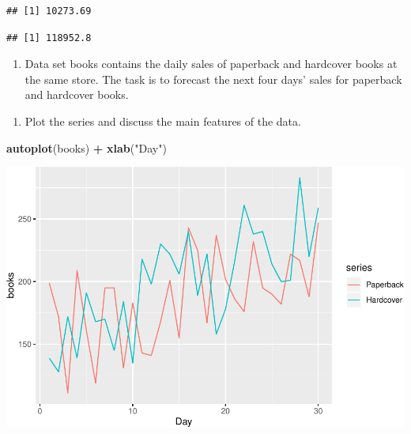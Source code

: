 \documentclass[]{article}
\newenvironment{Shaded}{\begin{snugshade}}{\end{snugshade}}
\newcommand{\KeywordTok}[1]{\textcolor[rgb]{0.13,0.29,0.53}{\textbf{#1}}}
\newcommand{\DataTypeTok}[1]{\textcolor[rgb]{0.13,0.29,0.53}{#1}}
\newcommand{\DecValTok}[1]{\textcolor[rgb]{0.00,0.00,0.81}{#1}}
\newcommand{\FloatTok}[1]{\textcolor[rgb]{0.00,0.00,0.81}{#1}}
\newcommand{\StringTok}[1]{\textcolor[rgb]{0.31,0.60,0.02}{#1}}
\newcommand{\OperatorTok}[1]{\textcolor[rgb]{0.81,0.36,0.00}{\textbf{#1}}}
\newcommand{\NormalTok}[1]{#1}
\providecommand{\tightlist}{%
  \setlength{\itemsep}{0pt}\setlength{\parskip}{0pt}}
\begin{document}
\begin{verbatim}
## [1] 10273.69
\end{verbatim}

\begin{Shaded}
\end{Shaded}

\begin{verbatim}
## [1] 118952.8
\end{verbatim}

\begin{enumerate}
\def\labelenumi{\arabic{enumi}.}
\setcounter{enumi}{4}
\tightlist
\item
  Data set books contains the daily sales of paperback and hardcover
  books at the same store. The task is to forecast the next four days'
  sales for paperback and hardcover books.
\end{enumerate}

\begin{enumerate}
\def\labelenumi{\alph{enumi})}
\tightlist
\item
  Plot the series and discuss the main features of the data.
\end{enumerate}

\begin{Shaded}
\begin{Highlighting}[]
\KeywordTok{autoplot}\NormalTok{(books) }\OperatorTok{+}\StringTok{ }\KeywordTok{xlab}\NormalTok{(}\StringTok{"Day"}\NormalTok{)}
\end{Highlighting}
\end{Shaded}

\includegraphics{Hw4_files/figure-latex/unnamed-chunk-5-1.pdf}
\end{document}
